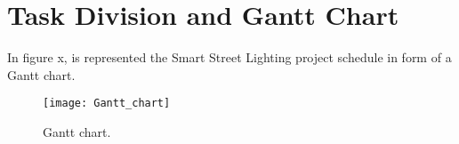 \section{Task Division and Gantt Chart}
In figure x, is represented the Smart Street Lighting project schedule in form of a Gantt chart.

\begin{figure}[ht]
	\centering
	\texttt{[image: Gantt\_chart]}
	\caption{Gantt chart.}
	\label{fig:Gantt_chart}
\end{figure}
